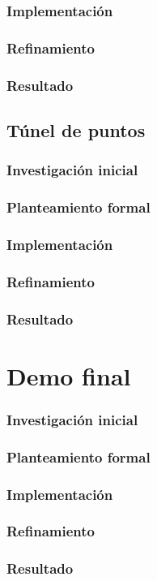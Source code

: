 \subsection{Implementación}
\subsection{Refinamiento}
\subsection{Resultado}

\section{Túnel de puntos}

\subsection{Investigación inicial}
\subsection{Planteamiento formal}
\subsection{Implementación}
\subsection{Refinamiento}
\subsection{Resultado}

\chapter{Demo final}

\subsection{Investigación inicial}
\subsection{Planteamiento formal}
\subsection{Implementación}
\subsection{Refinamiento}
\subsection{Resultado}
